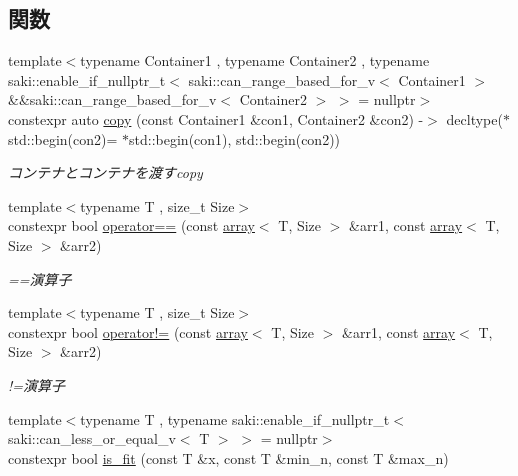 \subsection*{関数}
\begin{DoxyCompactItemize}
\item 
{\footnotesize template$<$typename Container1 , typename Container2 , typename saki\+::enable\+\_\+if\+\_\+nullptr\+\_\+t$<$ saki\+::can\+\_\+range\+\_\+based\+\_\+for\+\_\+v$<$ Container1 $>$ \&\&saki\+::can\+\_\+range\+\_\+based\+\_\+for\+\_\+v$<$ Container2 $>$ $>$  = nullptr$>$ }\\constexpr auto \mbox{\hyperlink{namespacesaki_abd8c75003f2a213607842f5d82eac806}{copy}} (const Container1 \&con1, Container2 \&con2) -\/$>$ decltype($\ast$std\+::begin(con2)= $\ast$std\+::begin(con1), std\+::begin(con2))
\begin{DoxyCompactList}\small\item\em コンテナとコンテナを渡すcopy \end{DoxyCompactList}\item 
{\footnotesize template$<$typename T , size\+\_\+t Size$>$ }\\constexpr bool \mbox{\hyperlink{namespacesaki_a5ce8a66ed6ece15fa9ddeaec2746374d}{operator==}} (const \mbox{\hyperlink{classsaki_1_1array}{array}}$<$ T, Size $>$ \&arr1, const \mbox{\hyperlink{classsaki_1_1array}{array}}$<$ T, Size $>$ \&arr2)
\begin{DoxyCompactList}\small\item\em ==演算子 \end{DoxyCompactList}\item 
{\footnotesize template$<$typename T , size\+\_\+t Size$>$ }\\constexpr bool \mbox{\hyperlink{namespacesaki_aed742cc915a830fea9f4993c0a031c45}{operator!=}} (const \mbox{\hyperlink{classsaki_1_1array}{array}}$<$ T, Size $>$ \&arr1, const \mbox{\hyperlink{classsaki_1_1array}{array}}$<$ T, Size $>$ \&arr2)
\begin{DoxyCompactList}\small\item\em !=演算子 \end{DoxyCompactList}\item 
{\footnotesize template$<$typename T , typename saki\+::enable\+\_\+if\+\_\+nullptr\+\_\+t$<$ saki\+::can\+\_\+less\+\_\+or\+\_\+equal\+\_\+v$<$ T $>$ $>$  = nullptr$>$ }\\constexpr bool \mbox{\hyperlink{namespacesaki_a45597d7382905409bada2316f78502fc}{is\+\_\+fit}} (const T \&x, const T \&min\+\_\+n, const T \&max\+\_\+n)

\end{DoxyCompactItemize}
